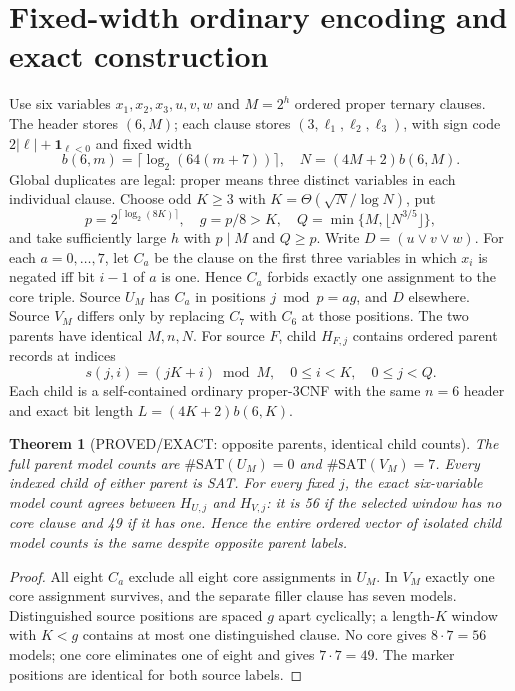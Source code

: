 \documentclass[11pt]{article}
\newtheorem{theorem}{Theorem}
\begin{document}
\section{Fixed-width ordinary encoding and exact construction}
Use six variables \(x_1,x_2,x_3,u,v,w\) and \(M=2^h\) ordered proper ternary clauses. The header stores \((6,M)\); each clause stores \((3,\ell_1,\ell_2,\ell_3)\), with sign code \(2|\ell|+\mathbf1_{\ell<0}\) and fixed width
\[
b(6,m)=\lceil\log_2(64(m+7))\rceil,\quad
N=(4M+2)b(6,M).
\]
Global duplicates are legal: proper means three distinct variables in each individual clause. Choose odd \(K\ge3\) with \(K=\Theta(\sqrt N/\log N)\), put
\[
p=2^{\lceil\log_2(8K)\rceil},\quad g=p/8>K,\quad
Q=\min\{M,\lfloor N^{3/5}\rfloor\},
\]
and take sufficiently large \(h\) with \(p\mid M\) and \(Q\ge p\).
Write \(D=(u\vee v\vee w)\). For each \(a=0,\ldots,7\), let \(C_a\) be the clause on the first three variables in which \(x_i\) is negated iff bit \(i-1\) of \(a\) is one. Hence \(C_a\) forbids exactly one assignment to the core triple. Source \(U_M\) has \(C_a\) in positions \(j\bmod p=ag\), and \(D\) elsewhere. Source \(V_M\) differs only by replacing \(C_7\) with \(C_6\) at those positions. The two parents have identical \(M,n,N\).
For source \(F\), child \(H_{F,j}\) contains ordered parent records at indices
\[
s(j,i)=(jK+i)\bmod M,\quad 0\le i<K,\quad0\le j<Q.
\]
Each child is a self-contained ordinary proper-3CNF with the same \(n=6\) header and exact bit length \(L=(4K+2)b(6,K)\).

\begin{theorem}[PROVED/EXACT: opposite parents, identical child counts]
The full parent model counts are \(\#\mathrm{SAT}(U_M)=0\) and \(\#\mathrm{SAT}(V_M)=7\). Every indexed child of either parent is SAT. For every fixed \(j\), the exact six-variable model count agrees between \(H_{U,j}\) and \(H_{V,j}\): it is 56 if the selected window has no core clause and 49 if it has one. Hence the entire ordered vector of isolated child model counts is the same despite opposite parent labels.
\end{theorem}
\begin{proof}
All eight \(C_a\) exclude all eight core assignments in \(U_M\). In \(V_M\) exactly one core assignment survives, and the separate filler clause has seven models. Distinguished source positions are spaced \(g\) apart cyclically; a length-\(K\) window with \(K<g\) contains at most one distinguished clause. No core gives \(8\cdot7=56\) models; one core eliminates one of eight and gives \(7\cdot7=49\). The marker positions are identical for both source labels.
\end{proof}
\end{document}
